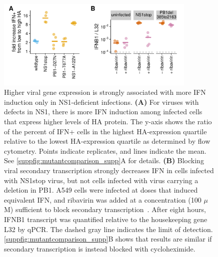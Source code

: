 \documentclass[10pt,letterpaper]{article}
\newcommand{\SUPPFIG}[1]{\autoref{suppfig:#1}}
\begin{document}
\begin{figure}[b!]
\centerline{\includegraphics[width=0.85\textwidth]{figures/MutantComparison/p_merged.pdf}}
\caption{
Higher viral gene expression is strongly associated with more IFN induction only in NS1-deficient infections.
{\bf (A)}
For viruses with defects in NS1, there is more IFN induction among infected cells that express higher levels of HA protein.
The y-axis shows the ratio of the percent of IFN+ cells in the highest HA-expression quartile relative to the lowest HA-expression quartile as determined by flow cytometry.
Points indicate replicates, and lines indicate the mean.
See \SUPPFIG{mutantcomparison_supp}A for details.
{\bf (B)}
Blocking viral secondary transcription strongly decreases IFN in cells infected with NS1stop virus, but not cells infected with virus carrying a deletion in PB1.
A549 cells were infected at doses that induced equivalent IFN, and ribavirin was added at a concentration (100 $\mu$M) sufficient to block secondary transcription~\citep{Vanderlinden:2016ec,reuther2015generation,Scholtissek:1976wg}.
After eight hours, IFNB1 transcript was quantified relative to the housekeeping gene L32 by qPCR. 
The dashed gray line indicates the limit of detection.
\SUPPFIG{mutantcomparison_supp}B shows that results are similar if secondary transcription is instead blocked with cycloheximide.
}
\label{fig:mutantcomparison}
\end{figure}
\end{document}

